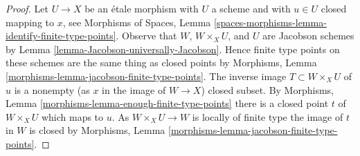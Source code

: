 \documentclass{stacks-project}
\theoremstyle{plain}
\theoremstyle{definition}
\theoremstyle{remark}
\numberwithin{equation}{subsection}
\begin{document}
\begin{proof}
Let $U \to X$ be an \'etale morphism with $U$ a scheme and with $u \in U$
closed mapping to $x$, see
Morphisms of Spaces, Lemma
\ref{spaces-morphisms-lemma-identify-finite-type-points}.
Observe that $W$, $W \times_X U$, and $U$ are Jacobson schemes
by Lemma \ref{lemma-Jacobson-universally-Jacobson}.
Hence finite type points on these schemes
are the same thing as closed points by
Morphisms, Lemma \ref{morphisms-lemma-jacobson-finite-type-points}.
The inverse image $T \subset W \times_X U$ of $u$ is a nonempty
(as $x$ in the image of $W \to X$) closed subset.
By Morphisms, Lemma \ref{morphisms-lemma-enough-finite-type-points}
there is a closed point $t$ of $W \times_X U$ which maps to $u$.
As $W \times_X U \to W$ is locally of finite type
the image of $t$ in $W$ is closed by
Morphisms, Lemma \ref{morphisms-lemma-jacobson-finite-type-points}.
\end{proof}
\end{document}
